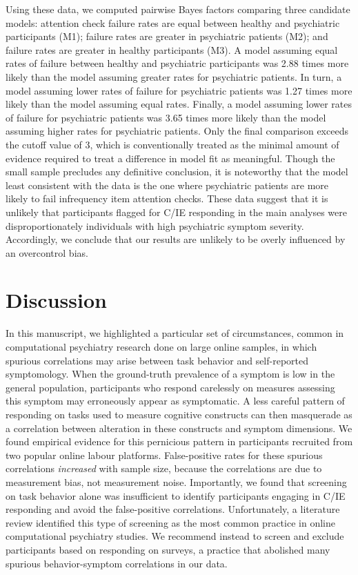 \documentclass[a4paper,notitlepage,12pt]{article}
\begin{document}
\begin{refsection}[main]
Using these data, we computed pairwise Bayes factors comparing three candidate models: attention check failure rates are equal between healthy and psychiatric participants (M1); failure rates are greater in psychiatric patients (M2); and failure rates are greater in healthy participants (M3). A model assuming equal rates of failure between healthy and psychiatric participants was 2.88 times more likely than the model assuming greater rates for psychiatric patients. In turn, a model assuming lower rates of failure for psychiatric patients was 1.27 times more likely than the model assuming equal rates. Finally, a model assuming lower rates of failure for psychiatric patients was 3.65 times more likely than the model assuming higher rates for psychiatric patients. Only the final comparison exceeds the cutoff value of 3, which is conventionally treated as the minimal amount of evidence required to treat a difference in model fit as meaningful. Though the small sample precludes any definitive conclusion, it is noteworthy that the model least consistent with the data is the one where psychiatric patients are more likely to fail infrequency item attention checks. These data suggest that it is unlikely that participants flagged for C/IE responding in the main analyses were disproportionately individuals with high psychiatric symptom severity. Accordingly, we conclude that our results are unlikely to be overly influenced by an overcontrol bias.

\section{Discussion}

In this manuscript, we highlighted a particular set of circumstances, common in computational psychiatry research done on large online samples, in which spurious correlations may arise between task behavior and self-reported symptomology. When the ground-truth prevalence of a symptom is low in the general population, participants who respond carelessly on measures assessing this symptom may erroneously appear as symptomatic. A less careful pattern of responding on tasks used to measure cognitive constructs can then masquerade as a correlation between alteration in these constructs and symptom dimensions. We found empirical evidence for this pernicious pattern in participants recruited from two popular online labour platforms. False-positive rates for these spurious correlations \emph{increased} with sample size, because the correlations are due to measurement bias, not measurement noise. Importantly, we found that screening on task behavior alone was insufficient to identify participants engaging in C/IE responding and avoid the false-positive correlations. Unfortunately, a literature review identified this type of screening as the most common practice in online computational psychiatry studies. We recommend instead to screen and exclude participants based on responding on surveys, a practice that abolished many spurious behavior-symptom correlations in our data. 


\end{refsection}
\end{document}
